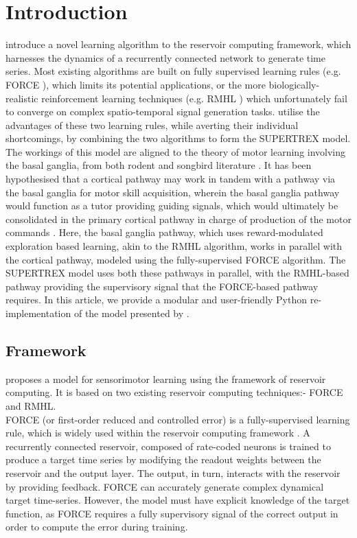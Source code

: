

\section{Introduction}

\textcite{pyle2019} introduce a novel learning algorithm to the reservoir computing framework, which harnesses the dynamics of a recurrently connected network to generate time series. Most existing algorithms are built on fully supervised learning rules (e.g. FORCE \cite{sussillo2009}), which limits its potential applications, or the more biologically-realistic reinforcement learning techniques (e.g. RMHL \cite{hoerzer2014}) which unfortunately fail to converge on complex spatio-temporal signal generation tasks. \textcite{pyle2019} utilise the advantages of these two learning rules, while averting their individual shortcomings, by combining the two algorithms to form the SUPERTREX model. The workings of this model are aligned to the theory of motor learning involving the basal ganglia, from both rodent and songbird literature \cite{brainard2002}. It has been hypothesised that a cortical pathway may work in tandem with a pathway via the basal ganglia for motor skill acquisition, wherein the basal ganglia pathway would function as a tutor providing guiding signals, which would ultimately be consolidated in the primary cortical pathway in charge of production of the motor commands \cite{olveczky2011}. Here, the basal ganglia pathway, which uses reward-modulated exploration based learning, akin to the RMHL algorithm, works in parallel with the cortical pathway, modeled using the fully-supervised FORCE algorithm. The SUPERTREX model uses both these pathways in parallel, with the RMHL-based pathway providing the supervisory signal that the FORCE-based pathway requires.
%
In this article, we provide a modular and user-friendly Python re-implementation of the model presented by \textcite{pyle2019}.




\subsection{Framework}

\textcite{pyle2019} proposes a model for sensorimotor learning using the framework of reservoir computing. It is based on two existing reservoir computing techniques:- FORCE and RMHL.\\

FORCE (or first-order reduced and controlled error) is a fully-supervised learning rule, which is widely used within the reservoir computing framework \cite{sussillo2009}. A recurrently connected reservoir, composed of rate-coded neurons is trained to produce a target time series by modifying the readout weights between the reservoir and the output layer. The output, in turn, interacts with the reservoir by providing feedback. FORCE can accurately generate complex dynamical target time-series. However, the model must have explicit knowledge of the target function, as FORCE requires a fully supervisory signal of the correct output in order to compute the error during training. \\


